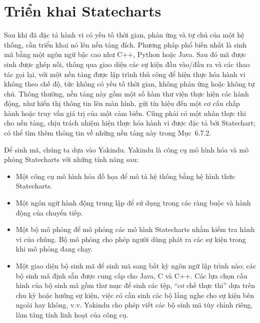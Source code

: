 \section{Triển khai Statecharts}
Sau khi đã đặc tả hành vi có yếu tố thời gian, phản ứng và tự chủ của một hệ thống, cần triển khai nó lên nền tảng đích. Phương pháp phổ biến nhất là sinh mã bằng một ngôn ngữ bậc cao như C++, Python hoặc Java. Sau đó mã được sinh được ghép nối, thông qua giao diện các sự kiện đầu vào/đầu ra và các thao tác gọi lại, với một nền tảng được lập trình thủ công để hiện thực hóa hành vi không theo chế độ, tức không có yếu tố thời gian, không phản ứng hoặc không tự chủ. Thông thường, nền tảng này gồm một số hàm thư viện thực hiện các hành động, như hiển thị thông tin lên màn hình, gửi tín hiệu đến một cơ cấu chấp hành hoặc truy vấn giá trị của một cảm biến. Cũng phải có một nhân thực thi cho nền tảng, chịu trách nhiệm hiện thực hóa hành vi được đặc tả bởi Statechart; có thể tìm thêm thông tin về những nền tảng này trong Mục~6.7.2.

Để sinh mã, chúng ta dựa vào Yakindu. Yakindu là công cụ mô hình hóa và mô phỏng Statecharts với những tính năng sau:
\begin{itemize}
\item Một công cụ mô hình hóa đồ họa để mô tả hệ thống bằng hệ hình thức Statecharts.
\item Một ngôn ngữ hành động trung lập để sử dụng trong các ràng buộc và hành động của chuyển tiếp.
\item Một bộ mô phỏng để mô phỏng các mô hình Statecharts nhằm kiểm tra hành vi của chúng. Bộ mô phỏng cho phép người dùng phát ra các sự kiện trong khi mô phỏng đang chạy.
\item Một giao diện bộ sinh mã để sinh mã sang bất kỳ ngôn ngữ lập trình nào; các bộ sinh mã định sẵn được cung cấp cho Java, C và C++. Các lựa chọn cấu hình của bộ sinh mã gồm thư mục để sinh các tệp, ``cơ chế thực thi'' dựa trên chu kỳ hoặc hướng sự kiện, việc có cần sinh các bộ lắng nghe cho sự kiện bên ngoài hay không, v.v. Yakindu cho phép viết các bộ sinh mã tùy chỉnh riêng, làm tăng tính linh hoạt của công cụ.
\end{itemize}


